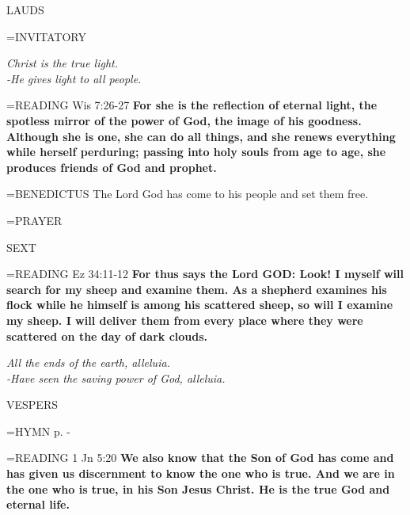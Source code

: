 \begin{flushleft}\normalsize LAUDS\\\end{flushleft}

\hangindent=\parindent \small{INVITATORY}
\begin{center}
\textit{Christ is the true light.\\}
\textit{-He gives light to all people.\\}
\end{center}

\hangindent=\parindent \small{READING}    Wis 7:26-27 \textbf{   For she is the reflection of eternal light, the spotless mirror of the power of God, the image of his goodness. Although she is one, she can do all things, and she renews everything while herself perduring; passing into holy souls from age to age, she produces friends of God and prophet.\\}

\hangindent=\parindent \small{BENEDICTUS 	The Lord God has come to his people and set them free.\\}

\hangindent=\parindent \small{PRAYER 	}

\begin{flushleft}\normalsize SEXT\\\end{flushleft}

\hangindent=\parindent \small{READING}    Ez 34:11-12 \textbf{   For thus says the Lord GOD: Look! I myself will search for my sheep and examine them. As a shepherd examines his flock while he himself is among his scattered sheep, so will I examine my sheep. I will deliver them from every place where they were scattered on the day of dark clouds.}

\begin{center}
\textit{All the ends of the earth, alleluia.\\
-Have seen the saving power of God, alleluia.}
\end{center}

\begin{flushleft}\normalsize VESPERS\\\end{flushleft}

\hangindent=\parindent \small{\uppercase{HYMN} p.  \pageref{christmas:firstHymn} - \pageref{christmas:lastHymn}\\}

\hangindent=\parindent \small{READING}    1 Jn 5:20 \textbf{   We also know that the Son of God has come and has given us discernment to know the one who is true. And we are in the one who is true, in his Son Jesus Christ. He is the true God and eternal life.\\}

